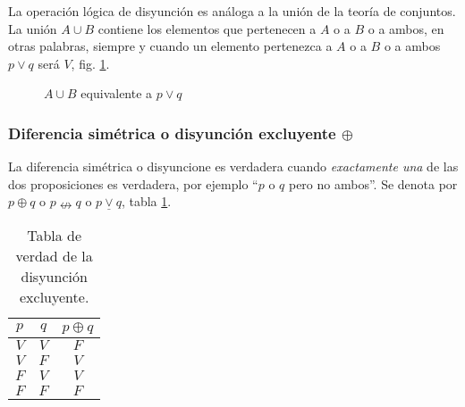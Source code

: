 La operación lógica de disyunción es análoga a la unión de la teoría de conjuntos. La unión $A \cup B$ contiene los elementos que pertenecen a $A$ o a $B$ o a ambos, en otras palabras, siempre y cuando un elemento pertenezca a $A$ o a $B$ o a ambos $p \lor q$ será $V$, fig. \ref{fig:disyuncion}.

\begin{figure}[H]
	\centering
	\caption{$A \cup B$ equivalente a $p \lor q$}
	\label{fig:disyuncion}
\end{figure}

\subsubsection{Diferencia simétrica o disyunción excluyente $\oplus$}
 
La diferencia simétrica o \gls{disyuncione} es verdadera cuando \textit{exactamente una} de las dos proposiciones es verdadera, por ejemplo ``$p$ o $q$ pero no ambos''. Se denota por $p \oplus q$ o $p \nleftrightarrow q$ o $p \underline{\vee} q$, tabla \ref{tab:disyuncion_excluyente}.

\begin{table}[H]
	\centering
	\begin{tabular}{|c|c|c|} \hline
		$p$ & $q$ & $p \oplus q$ \\ \hline
		$V$ & $V$ & $F$ \\
		$V$ & $F$ & $V$ \\
		$F$ & $V$ & $V$ \\
		$F$ & $F$ & $F$ \\ \hline
	\end{tabular}
	\caption{Tabla de verdad de la disyunción excluyente.}
	\label{tab:disyuncion_excluyente}
\end{table}

